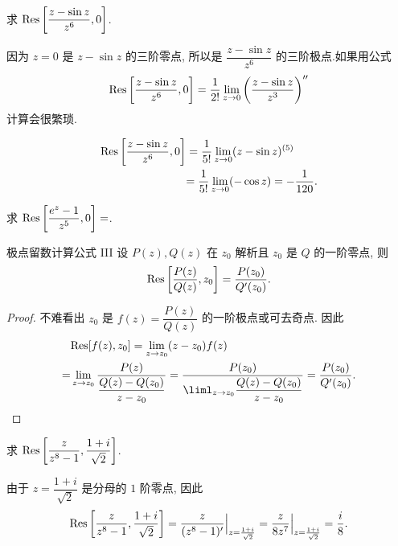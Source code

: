 \begin{example}
	求 ${\mathrm{Res}}\left[\dfrac{z-\sin z}{z^6},0\right]$.
\end{example}

\begin{solution}
		因为 $z=0$ 是 $z-\sin z$ 的三阶零点,
	{所以是 $\dfrac{z-\sin z}{z^6}$ 的三阶极点.如果用公式
		\[{\mathrm{Res}}\left[\frac{z-\sin z}{z^6},0\right]
		=\frac1{2!}\lim_{z\to0}\left(\frac{z-\sin z}{z^3}\right)''\]
		计算会很繁琐.
	}

	{
	\begin{align*}
		{\mathrm{Res}}\left[\frac{z-\sin z}{z^6},0\right]&=\frac1{5!}\lim_{z\to0}(z-\sin z)^{(5)}\\
		&{=\frac1{5!}\lim_{z\to0}(-\cos z)=-\frac1{120}.}
	\end{align*}}
\end{solution}

\begin{exercise}
		求 ${\mathrm{Res}}\left[\dfrac{e^z-1}{z^5},0\right]=$.
\end{exercise}

\begin{theorem}{极点留数计算公式 III}
	设 $P(z),Q(z)$ 在 $z_0$ 解析且 $z_0$ 是 $Q$ 的一阶零点, 则
	\[{\mathrm{Res}}\left[\frac{P(z)}{Q(z)},z_0\right]=\frac{P(z_0)}{Q'(z_0)}.\]
\end{theorem}

\begin{proof}
	不难看出 $z_0$ 是 $f(z)=\dfrac{P(z)}{Q(z)}$ 的一阶极点或可去奇点. 因此
	\begin{align*}
			&\Res[f(z),z_0]=\lim_{z\to z_0}(z-z_0)f(z)\\
		=&\lim_{z\to z_0}\frac{P(z)}{\dfrac{Q(z)-Q(z_0)}{z-z_0}}
		=\frac{P(z_0)}{\liml_{z\to z_0}\dfrac{Q(z)-Q(z_0)}{z-z_0}}=\frac{P(z_0)}{Q'(z_0)}.\qedhere
	\end{align*}
\end{proof}

\begin{example}
	求 ${\mathrm{Res}}\left[\dfrac{z}{z^8-1},\dfrac{1+i}{\sqrt2}\right]$.
\end{example}

\begin{solution}
		由于 $z=\dfrac{1+i}{\sqrt2}$ 是分母的 $1$ 阶零点,
	{因此
		\[{\mathrm{Res}}\left[\frac z{z^8-1},\frac{1+i}{\sqrt2}\right]
		=\frac z{(z^8-1)'}\Big|_{z=\frac{1+i}{\sqrt2}}
		=\frac z{8z^7}\Big|_{z=\frac{1+i}{\sqrt2}}
		=\frac i8.\]
	}
\end{solution}


